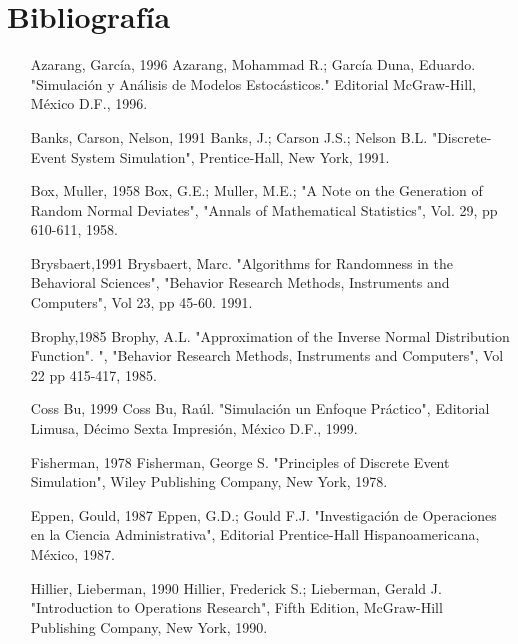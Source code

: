 \newpage




\section*{Bibliografía}
\begin{itemize}
\item [Azarang, García, 1996]
Azarang, Mohammad R.; García Duna, Eduardo. "Simulación y Análisis de Modelos Estocásticos." Editorial McGraw-Hill, México D.F., 1996.


\item [Banks, Carson, Nelson, 1991]
Banks, J.; Carson J.S.; Nelson B.L. "Discrete-Event System Simulation", Prentice-Hall, New York, 1991.

\item
[Box, Muller, 1958]
Box, G.E.; Muller, M.E.; "A Note on the Generation of Random Normal Deviates", "Annals of Mathematical Statistics", Vol. 29, pp 610-611, 1958.

\item
[Brysbaert,1991]
Brysbaert, Marc. "Algorithms for Randomness in the Behavioral Sciences", "Behavior Research Methods, Instruments and Computers", Vol 23, pp 45-60. 1991.

\item
[Brophy,1985]
Brophy, A.L. "Approximation of the Inverse Normal Distribution Function". ", "Behavior Research Methods, Instruments and Computers", Vol 22 pp 415-417, 1985.
\item
[Coss Bu, 1999]
Coss Bu, Raúl. "Simulación un Enfoque Práctico", Editorial Limusa, Décimo Sexta Impresión, México D.F., 1999.

\item
[Fisherman, 1978]
Fisherman, George S. "Principles of Discrete Event Simulation", Wiley Publishing Company, New York, 1978.

\item
[Eppen, Gould, 1987]
Eppen, G.D.; Gould F.J. "Investigación de Operaciones en la Ciencia Administrativa", Editorial Prentice-Hall Hispanoamericana, México, 1987.

\item
[Hillier, Lieberman, 1990]
Hillier, Frederick S.; Lieberman, Gerald J. "Introduction to Operations Research", Fifth Edition, McGraw-Hill Publishing Company, New York, 1990.


\end{itemize}
